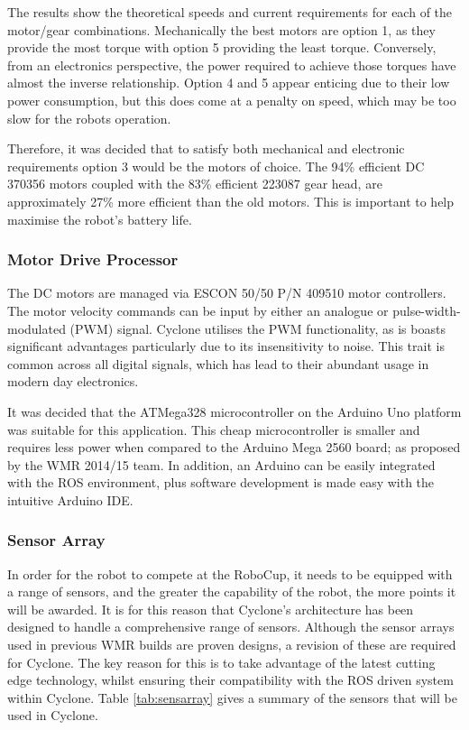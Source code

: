 The results show the theoretical speeds and current requirements for each of the motor/gear combinations. Mechanically the best motors are option 1, as they provide the most torque with option 5 providing the least torque. Conversely, from an electronics perspective, the power required to achieve those torques have almost the inverse relationship. Option 4 and 5 appear enticing due to their low power consumption, but this does come at a penalty on speed, which may be too slow for the robots operation.\par

Therefore, it was decided that to satisfy both mechanical and electronic requirements option 3 would be the motors of choice. The 94\% efficient DC 370356 motors coupled with the 83\% efficient 223087 gear head, are approximately 27\% more efficient than the old motors. This is important to help maximise the robot’s battery life.\par

\subsubsection{Motor Drive Processor}
The DC motors are managed via ESCON 50/50 P/N 409510 motor controllers. The motor velocity commands can be input by either an analogue or pulse-width-modulated (PWM) signal. Cyclone utilises the PWM functionality, as is boasts significant advantages particularly due to its insensitivity to noise. This trait is common across all digital signals, which has lead to their abundant usage in modern day electronics.\par

It was decided that the ATMega328 microcontroller on the Arduino Uno platform was suitable for this application. This cheap microcontroller is smaller and requires less power when compared to the Arduino Mega 2560 board; as proposed by the WMR 2014/15 team. In addition, an Arduino can be easily integrated with the ROS environment, plus software development is made easy with the intuitive Arduino IDE.\par

\subsubsection{Sensor Array}
In order for the robot to compete at the RoboCup, it needs to be equipped with a range of sensors, and the greater the capability of the robot, the more points it will be awarded. It is for this reason that Cyclone’s architecture has been designed to handle a comprehensive range of sensors. Although the sensor arrays used in previous WMR builds are proven designs, a revision of these are required for Cyclone. The key reason for this is to take advantage of the latest cutting edge technology, whilst ensuring their compatibility with the ROS driven system within Cyclone. Table \ref{tab:sensarray} gives a summary of the sensors that will be used in Cyclone.\par


